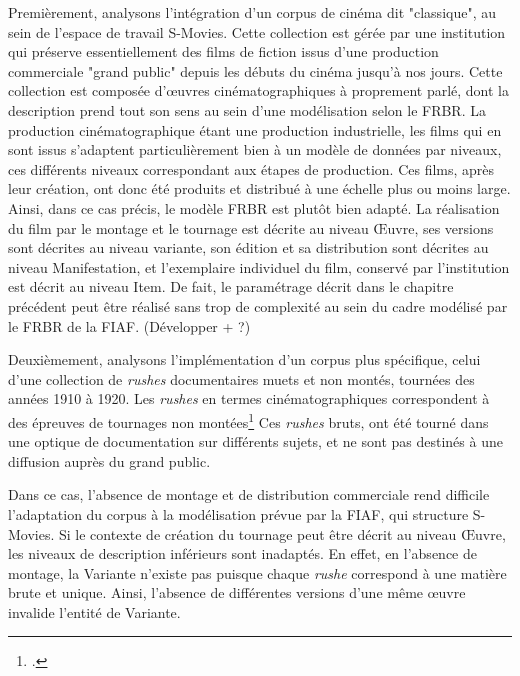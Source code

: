 Premièrement, analysons l'intégration d'un corpus de cinéma dit "classique", au sein de l'espace de travail S-Movies. Cette collection est gérée par une institution qui préserve essentiellement des films de fiction issus d'une production commerciale "grand public" depuis les débuts du cinéma jusqu'à nos jours. Cette collection est composée d’œuvres cinématographiques à proprement parlé, dont la description prend tout son sens au sein d’une modélisation selon le FRBR. La production cinématographique étant une production industrielle, les films qui en sont issus s'adaptent particulièrement bien à un modèle de données par niveaux, ces différents niveaux correspondant aux étapes de production. Ces films, après leur création, ont donc été produits et distribué à une échelle plus ou moins large. Ainsi, dans ce cas précis, le modèle FRBR est plutôt bien adapté. La réalisation du film par le montage et le tournage est décrite au niveau Œuvre, ses versions sont décrites au niveau variante, son édition et sa distribution sont décrites au niveau Manifestation, et l'exemplaire individuel du film, conservé par l'institution est décrit au niveau Item. De fait, le paramétrage décrit dans le chapitre précédent peut être réalisé sans trop de complexité au sein du cadre modélisé par le FRBR de la FIAF. (Développer + ?) 

Deuxièmement, analysons l'implémentation d'un corpus plus spécifique, celui d'une collection de \textit{rushes} documentaires muets et non montés, tournées des années 1910 à 1920. Les \textit{rushes} en termes cinématographiques correspondent à des épreuves de tournages non montées\footcite{universalis.} Ces \textit{rushes} bruts, ont été tourné dans une optique de documentation sur différents sujets, et ne sont pas destinés à une diffusion auprès du grand public. 

Dans ce cas, l'absence de montage et de distribution commerciale rend difficile l'adaptation du corpus à la modélisation prévue par la FIAF, qui structure S-Movies. Si le contexte de création du tournage peut être décrit au niveau Œuvre, les niveaux de description inférieurs sont inadaptés. En effet, en l'absence de montage, la Variante n'existe pas puisque chaque \textit{rushe} correspond à une matière brute et unique. Ainsi, l'absence de différentes versions d'une même œuvre invalide l'entité de Variante.  

